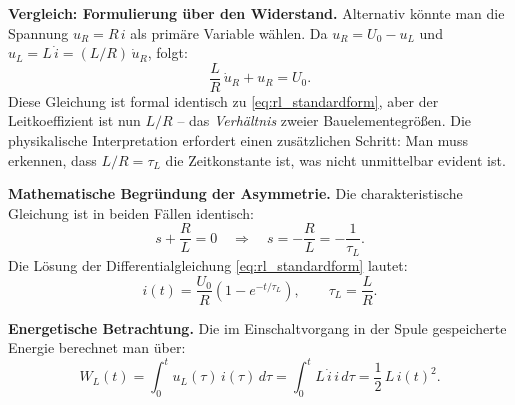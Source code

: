 ﻿\documentclass[12pt, a4paper]{article}
\begin{document}
	\textbf{Vergleich: Formulierung über den Widerstand.}
	Alternativ könnte man die Spannung $u_R = R\,i$ als primäre Variable wählen.
	Da $u_R = U_0 - u_L$ und $u_L = L\,\dot{i} = (L/R)\,\dot{u}_R$, folgt:
	\begin{equation}
		\frac{L}{R}\,\dot{u}_R + u_R = U_0.
		\label{eq:rl_widerstand}
	\end{equation}
	Diese Gleichung ist formal identisch zu \eqref{eq:rl_standardform}, aber
	der Leitkoeffizient ist nun $L/R$ -- das \emph{Verhältnis} zweier
	Bauelementegrößen. Die physikalische Interpretation erfordert einen
	zusätzlichen Schritt: Man muss erkennen, dass $L/R = \tau_L$ die
	Zeitkonstante ist, was nicht unmittelbar evident ist.
	
	\textbf{Mathematische Begründung der Asymmetrie.}
	Die charakteristische Gleichung ist in beiden Fällen identisch:
	\begin{equation}
		s + \frac{R}{L} = 0 \quad \Longrightarrow \quad s = -\frac{R}{L} = -\frac{1}{\tau_L}.
	\end{equation}
	Die Lösung der Differentialgleichung \eqref{eq:rl_standardform} lautet:
	\begin{equation}
		i(t) = \frac{U_0}{R}\left(1 - e^{-t/\tau_L}\right),
		\qquad \tau_L = \frac{L}{R}.
	\end{equation}
	
	\textbf{Energetische Betrachtung.}
	Die im Einschaltvorgang in der Spule gespeicherte Energie berechnet man über:
	\begin{equation}
		W_L(t) = \int_0^t u_L(\tau)\,i(\tau)\,d\tau
		= \int_0^t L\,\dot{i}\,i\,d\tau
		= \frac{1}{2}\,L\,i(t)^2.
	\end{equation}
	
\end{document}
